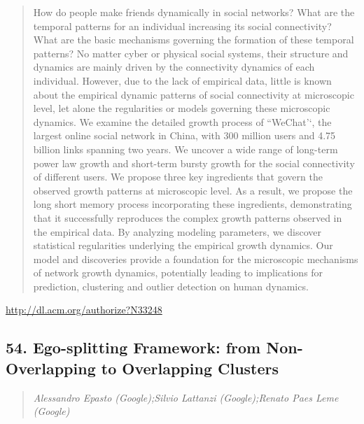\documentclass{article}
\begin{document}
\begin{quote}
How do people make friends dynamically in social networks? What are the temporal patterns for an individual increasing its social connectivity? What are the basic mechanisms governing the formation of these temporal patterns? No matter cyber or physical social systems, their structure and dynamics are mainly driven by the connectivity dynamics of each individual. However, due to the lack of empirical data, little is known about the empirical dynamic patterns of social connectivity at microscopic level, let alone the regularities or models governing these microscopic dynamics. We examine the detailed growth process of ``WeChat’‘, the largest online social network in China, with 300 million users and 4.75 billion links spanning two years. We uncover a wide range of long-term power law growth and short-term bursty growth for the social connectivity of different users. We propose three key ingredients that govern the observed growth patterns at microscopic level. As a result, we propose the long short memory process incorporating these ingredients, demonstrating that it successfully reproduces the complex growth patterns observed in the empirical data. By analyzing modeling parameters, we discover statistical regularities underlying the empirical growth dynamics. Our model and discoveries provide a foundation for the microscopic mechanisms of network growth dynamics, potentially leading to implications for prediction, clustering and outlier detection on human dynamics.
\end{quote}

\href{http://dl.acm.org/authorize?N33248}{http://dl.acm.org/authorize?N33248}

\subsection{54. Ego-splitting Framework: from Non-Overlapping to Overlapping Clusters}

\begin{quote}
\footnotesize{\textit{Alessandro Epasto (Google);Silvio Lattanzi (Google);Renato Paes Leme (Google)}}

\end{quote}
\end{document}
